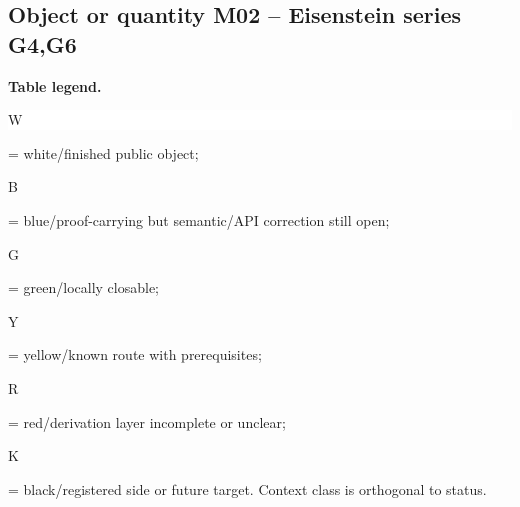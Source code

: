 \subsection*{Object or quantity M02 -- Eisenstein series G4,G6}
\hypertarget{objproof:M02}{}
\par\smallskip\noindent\begin{minipage}{0.99\linewidth}\footnotesize\raggedright\textbf{Table legend.} \colorbox{white}{\strut W} = white/finished public object; \colorbox{cyan!20}{\strut B} = blue/proof-carrying but semantic/API correction still open; \colorbox{green!18}{\strut G} = green/locally closable; \colorbox{yellow!25}{\strut Y} = yellow/known route with prerequisites; \colorbox{red!20}{\strut R} = red/derivation layer incomplete or unclear; \colorbox{black!18}{\strut K} = black/registered side or future target. Context class is orthogonal to status.\end{minipage}\par\vspace{0.25em}
